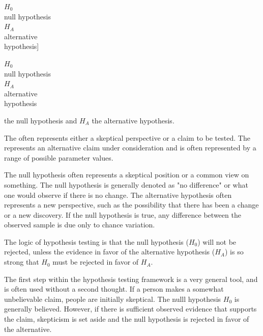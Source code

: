 $H_0$\\\footnotesize null hypothesis\vspace{3mm}\\\normalsize $H_A$\\\footnotesize alternative\\ hypothesis]{\raggedright\vspace{6mm}

$H_0$\\\footnotesize null hypothesis\vspace{3mm}\\\normalsize $H_A$\\\footnotesize alternative\\ hypothesis} the null hypothesis and $H_A$ the alternative hypothesis.

\begin{termBox}{
{\small The  often represents either a skeptical perspective or a claim to be tested. The  represents an alternative claim under consideration and is often represented by a range of possible parameter values.}}
\end{termBox}

The null hypothesis often represents a skeptical position or a common view on something. The null hypothesis is generally denoted as "no difference" or what one would observe if there is no change.  The alternative hypothesis often represents a new perspective, such as the possibility that there has been a change or a new discovery. If the null hypothesis is true, any difference between the observed sample is due only to chance variation. 

\begin{tipBox}{
The logic of hypothesis testing is that the null hypothesis ($H_0$) will not be rejected, unless the evidence in favor of the alternative hypothesis ($H_A$) is so strong that $H_0$ must be rejected in favor of $H_A$.}
\end{tipBox}

The first step within the hypothesis testing framework is a very general tool, and is often used without a second thought. If a person makes a somewhat unbelievable claim, people are initially skeptical. The nulll hypothesis $H_0$ is generally believed. However, if there is sufficient observed evidence that supports the claim, skepticism is set aside and the null hypothesis is rejected in favor of the alternative. 

